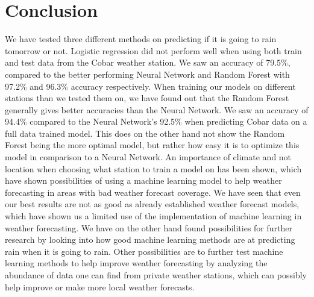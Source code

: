 \documentclass[11pt]{article}
\begin{document}
\section{Conclusion}
\label{sec:Conclusion}
We have tested three different methods on predicting if it is going to rain tomorrow or not. Logistic regression did not perform well when using both train and test data from the Cobar weather station. We saw an accuracy of 79.5\%, compared to the better performing Neural Network and Random Forest with 97.2\% and 96.3\% accuracy respectively. When training our models on different stations than we tested them on, we have found out that the Random Forest generally gives better accuracies than the Neural Network. We saw an accuracy of 94.4\% compared to the Neural Network's 92.5\% when predicting Cobar data on a full data trained model. This does on the other hand not show the Random Forest being the more optimal model, but rather how easy it is to optimize this model in comparison to a Neural Network. An importance of climate and not location when choosing what station to train a model on has been shown, which have shown possibilities of using a machine learning model to help weather forecasting in areas with bad weather forecast coverage. We have seen that even our best results are not as good as already established weather forecast models, which have shown us a limited use of the implementation of machine learning in weather forecasting. We have on the other hand found possibilities for further research by looking into how good machine learning methods are at predicting rain when it is going to rain. Other possibilities are to further test machine learning methods to help improve weather forecasting by analyzing the abundance of data one can find from private weather stations, which can possibly help improve or make more local weather forecasts.
\newpage

\printbibliography
\newpage
\appendix
\end{document}
